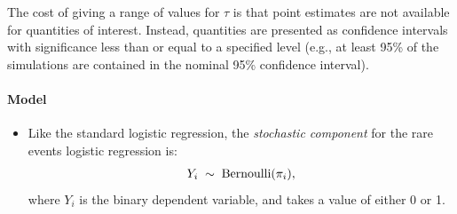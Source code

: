 \documentclass[letterpaper,10pt,english]{sphinxmanual}
\begin{document}
The cost of giving a range of values for \(\tau\) is that point
estimates are not available for quantities of interest. Instead,
quantities are presented as confidence intervals with significance less
than or equal to a specified level (e.g., at least 95\% of the
simulations are contained in the nominal 95\% confidence interval).


\paragraph{Model}
\label{zelig-relogit:model}\begin{itemize}
\item {} 
Like the standard logistic regression, the \emph{stochastic component} for
the rare events logistic regression is:
\begin{gather}
\begin{split}Y_i \; \sim \; \textrm{Bernoulli}(\pi_i),\end{split}\notag
\end{gather}
where \(Y_i\) is the binary dependent variable, and takes a value
of either 0 or 1.


\end{itemize}
\end{document}

